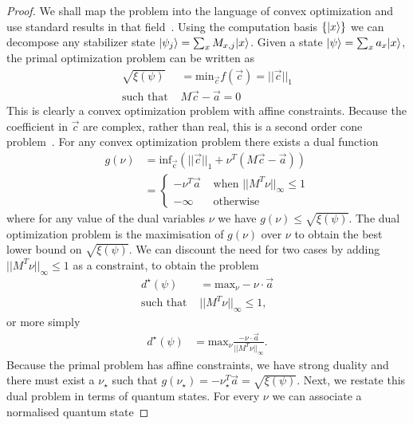 \begin{proof}
We shall map the problem into the language of convex optimization and use standard results in that field~\cite{boyd2004convex}.   Using the computation basis $\{ \vert {x} \rangle \}$ we can decompose any stabilizer state $\vert\psi_j\rangle =  \sum_{{x}} M_{{x}, j } \vert{x}\rangle $. Given a state $\vert\psi\rangle =  \sum_{{x}}  a_{{x}} \vert{x}\rangle $, the primal optimization problem can be written as
\begin{align}
	\sqrt{\xi( \psi )}  &  = \mathrm{min}_{\vec{c}}  f(\vec{c})=|| \vec{c} ||_1 \\
	\mbox{such that } & M\vec{c} - \vec{a}	 = 0
\end{align}
This is clearly a convex optimization problem with affine constraints.  Because the coefficient in $\vec{c}$ are complex, rather than real, this is a second order cone problem~\cite{boyd2004convex}.  For any convex optimization problem there exists a dual function
\begin{align}
	g(\nu) &  = \mathrm{inf_{\vec{c}}}  \left( || \vec{c} ||_1 + \nu^{T}(M\vec{c} - \vec{a}) \right) \\
	&= \begin{cases}  -  \nu^{T}\vec{a} & \mbox{ when } ||M^T\nu ||_{\infty} \leq 1 \\
		-  \infty & \mbox{ otherwise }
	\end{cases}
\end{align}
where for any value of the dual variables $\nu$ we have $g(\nu)  \leq \sqrt{\xi( \psi )} $.  The dual optimization problem is the maximisation of $g(\nu)$ over $\nu$ to obtain the best lower bound on  $\sqrt{\xi( \psi )}$.   We can discount the need for two cases by adding  $||M^T \nu  ||_{\infty} \leq 1$ as a constraint, to obtain the problem
\begin{align}
	d^{\star}( \psi )  &  = \mathrm{max}_{\nu}  -  \nu \cdot \vec{a} \\ \nonumber
	\mbox{such that } & || M^T\nu ||_{\infty} \leq 1  ,
\end{align}
or more simply
\begin{align}
	d^{\star}( \psi )  &  = \mathrm{max}_{\nu} \frac{ -  \nu \cdot \vec{a}}{|| M^T\nu ||_{\infty} } .
\end{align}
Because the primal problem has affine constraints, we have strong duality and there must exist a  $\nu_\star$ such that $g(\nu_{\star}) = -  \nu_{\star}^{T}\vec{a}  =  \sqrt{\xi( \psi )} $.   Next, we restate this dual problem in terms of quantum states.   For every $\nu$ we can associate a normalised quantum state

\end{proof}
